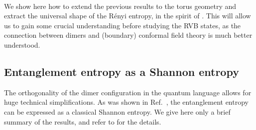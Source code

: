 \documentclass[11pt]{iopart}
\begin{document}
\paragraph{}
We show here how to extend the previous results to the torus geometry and extract the universal shape of the R\'enyi entropy, in the spirit of \cite{Ju2012}. This will allow us to gain some crucial understanding before studying the RVB states, as the connection between dimers and (boundary) conformal field theory is much better understood. 
\subsection{Entanglement entropy as a Shannon entropy}
The orthogonality of the dimer configuration in the quantum language allows for huge technical simplifications. As was shown in Ref.~\cite{Misguich}, the entanglement entropy can be expressed as a classical Shannon entropy. We give here only a brief summary of the results, and refer to \cite{Misguich} for the details.
\end{document}
